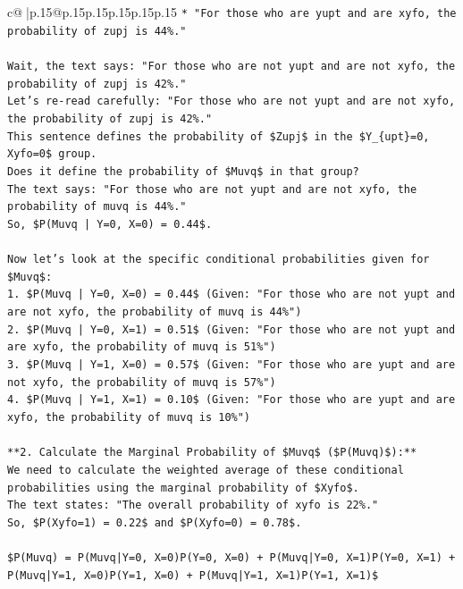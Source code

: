 \documentclass{article}
\begin{document}
{\begin{supertabular}{c@{$\;$}|p{.15\linewidth}@{}p{.15\linewidth}p{.15\linewidth}p{.15\linewidth}p{.15\linewidth}p{.15\linewidth}}
{{{\texttt{*   "For those who are yupt and are xyfo, the probability of zupj is 44\%."} \\
\\ 
\texttt{Wait, the text says: "For those who are not yupt and are not xyfo, the probability of zupj is 42\%."} \\
\texttt{Let's re{-}read carefully: "For those who are not yupt and are not xyfo, the probability of zupj is 42\%."} \\
\texttt{This sentence defines the probability of \$Zupj\$ in the \$Y\_\{upt\}=0, Xyfo=0\$ group.} \\
\texttt{Does it define the probability of \$Muvq\$ in that group?} \\
\texttt{The text says: "For those who are not yupt and are not xyfo, the probability of muvq is 44\%."} \\
\texttt{So, \$P(Muvq | Y=0, X=0) = 0.44\$.} \\
\\ 
\texttt{Now let's look at the specific conditional probabilities given for \$Muvq\$:} \\
\texttt{1.  \$P(Muvq | Y=0, X=0) = 0.44\$ (Given: "For those who are not yupt and are not xyfo, the probability of muvq is 44\%")} \\
\texttt{2.  \$P(Muvq | Y=0, X=1) = 0.51\$ (Given: "For those who are not yupt and are xyfo, the probability of muvq is 51\%")} \\
\texttt{3.  \$P(Muvq | Y=1, X=0) = 0.57\$ (Given: "For those who are yupt and are not xyfo, the probability of muvq is 57\%")} \\
\texttt{4.  \$P(Muvq | Y=1, X=1) = 0.10\$ (Given: "For those who are yupt and are xyfo, the probability of muvq is 10\%")} \\
\\ 
\texttt{**2. Calculate the Marginal Probability of \$Muvq\$ (\$P(Muvq)\$):**} \\
\texttt{We need to calculate the weighted average of these conditional probabilities using the marginal probability of \$Xyfo\$.} \\
\texttt{The text states: "The overall probability of xyfo is 22\%."} \\
\texttt{So, \$P(Xyfo=1) = 0.22\$ and \$P(Xyfo=0) = 0.78\$.} \\
\\ 
\texttt{\$P(Muvq) = P(Muvq|Y=0, X=0)P(Y=0, X=0) + P(Muvq|Y=0, X=1)P(Y=0, X=1) + P(Muvq|Y=1, X=0)P(Y=1, X=0) + P(Muvq|Y=1, X=1)P(Y=1, X=1)\$} \\
}}}
\end{supertabular}}
\end{document}
